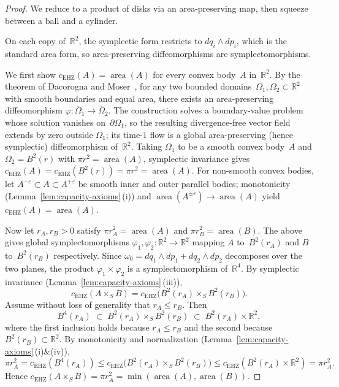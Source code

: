 \begin{proof}
We reduce to a product of disks via an area-preserving
map, then squeeze between a ball and a cylinder.

On each copy of~$\mathbb{R}^2$, the symplectic form
restricts to $dq_i \wedge dp_i$, which is the standard
area form, so area-preserving diffeomorphisms are
symplectomorphisms.

We first show $c_{\mathrm{EHZ}}(A) = \operatorname{area}(A)$
for every convex body~$A$ in~$\mathbb{R}^2$.
By the theorem of Dacorogna and
Moser~\cite{DacorognaMoser1990}, for any two bounded
domains~$\Omega_1, \Omega_2 \subset \mathbb{R}^2$ with
smooth boundaries and equal area, there exists an
area-preserving diffeomorphism
$\varphi \colon \overline{\Omega}_1 \to \overline{\Omega}_2$.
The construction solves a boundary-value problem whose
solution vanishes on~$\partial\Omega_1$, so the resulting
divergence-free vector field extends by zero outside
$\Omega_1$; its time-$1$ flow is a global area-preserving
(hence symplectic) diffeomorphism of~$\mathbb{R}^2$.
Taking $\Omega_1$ to be a smooth convex body~$A$
and $\Omega_2 = B^2(r)$ with $\pi r^2 = \operatorname{area}(A)$,
symplectic invariance gives
$c_{\mathrm{EHZ}}(A) = c_{\mathrm{EHZ}}(B^2(r)) = \pi r^2
= \operatorname{area}(A)$.
For non-smooth convex bodies, let
$A^{-\varepsilon} \subset A \subset A^{+\varepsilon}$
be smooth inner and outer parallel bodies;
monotonicity
(Lemma~\ref{lem:capacity-axioms}\,(i)) and
$\operatorname{area}(A^{\pm\varepsilon}) \to
\operatorname{area}(A)$ yield
$c_{\mathrm{EHZ}}(A) = \operatorname{area}(A)$.

Now let $r_A, r_B > 0$ satisfy
$\pi r_A^2 = \operatorname{area}(A)$ and
$\pi r_B^2 = \operatorname{area}(B)$.
The above gives global symplectomorphisms
$\varphi_1, \varphi_2 \colon \mathbb{R}^2 \to \mathbb{R}^2$
mapping $A$ to~$B^2(r_A)$ and $B$ to~$B^2(r_B)$
respectively.
Since $\omega_0 = dq_1 \wedge dp_1 + dq_2 \wedge dp_2$
decomposes over the two planes, the product
$\varphi_1 \times \varphi_2$ is a symplectomorphism
of~$\mathbb{R}^4$.
By symplectic invariance
(Lemma~\ref{lem:capacity-axioms}\,(iii)),
\[
  c_{\mathrm{EHZ}}(A \times_S B)
    = c_{\mathrm{EHZ}}\bigl(B^2(r_A) \times_S B^2(r_B)\bigr).
\]
Assume without loss of generality that $r_A \leq r_B$.
Then
\[
  B^4(r_A)
    \;\subset\; B^2(r_A) \times_S B^2(r_B)
    \;\subset\; B^2(r_A) \times \mathbb{R}^2,
\]
where the first inclusion holds because $r_A \leq r_B$
and the second because $B^2(r_B) \subset \mathbb{R}^2$.
By monotonicity and normalization
(Lemma~\ref{lem:capacity-axioms}\,(i)\&(iv)),
\[
  \pi r_A^2
    = c_{\mathrm{EHZ}}(B^4(r_A))
    \leq c_{\mathrm{EHZ}}\bigl(B^2(r_A) \times_S B^2(r_B)\bigr)
    \leq c_{\mathrm{EHZ}}(B^2(r_A) \times \mathbb{R}^2)
    = \pi r_A^2.
\]
Hence $c_{\mathrm{EHZ}}(A \times_S B)
  = \pi r_A^2
  = \min(\operatorname{area}(A), \operatorname{area}(B))$.
\end{proof}

